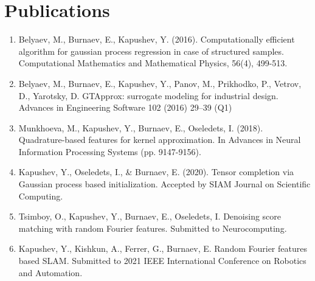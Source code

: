 \chapter{Publications}
\label{chap:publications}

\begin{enumerate}
    \item Belyaev, M., Burnaev, E., Kapushev, Y. (2016). Computationally efficient algorithm
    for gaussian process regression in case of structured samples. Computational Mathematics
    and Mathematical Physics, 56(4), 499-513.
    \item Belyaev, M., Burnaev, E., Kapushev, Y., Panov, M., Prikhodko, P., Vetrov, D., Yarotsky, D.
    GTApprox: surrogate modeling for industrial design. Advances in Engineering Software 102 (2016) 29–39 (Q1)
    \item Munkhoeva, M., Kapushev, Y., Burnaev, E., Oseledets, I. (2018). Quadrature-based
    features for kernel approximation. In Advances in Neural Information Processing Systems
    (pp. 9147-9156).
    \item Kapushev, Y., Oseledets, I., \& Burnaev, E. (2020). Tensor completion via Gaussian process based initialization. Accepted by SIAM Journal on Scientific Computing.
    \item Tsimboy, O., Kapushev, Y., Burnaev, E., Oseledets, I. Denoising score matching with random Fourier features. Submitted to Neurocomputing.
    \item Kapushev, Y., Kishkun, A., Ferrer, G., Burnaev, E. Random  Fourier  features  based  SLAM. Submitted to 2021 IEEE International Conference on Robotics and Automation.
\end{enumerate}
